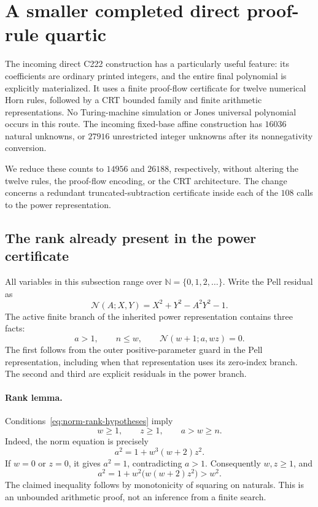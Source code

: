 \section{A smaller completed direct proof-rule quartic}
\label{sec:direct-normalized-power}

The incoming direct C222 construction has a particularly useful feature:
its coefficients are ordinary printed integers, and the entire final
polynomial is explicitly materialized. It uses a finite proof-flow
certificate for twelve numerical Horn rules, followed by a CRT bounded
family and finite arithmetic representations. No Turing-machine simulation
or Jones universal polynomial occurs in this route. The incoming
fixed-base affine construction has $16036$ natural unknowns, or $27916$
unrestricted integer unknowns after its nonnegativity conversion.

We reduce these counts to $14956$ and $26188$, respectively, without
altering the twelve rules, the proof-flow encoding, or the CRT architecture.
The change concerns a redundant truncated-subtraction certificate inside
each of the $108$ calls to the power representation.

\subsection{The rank already present in the power certificate}

All variables in this subsection range over $\mathbb N=\{0,1,2,\ldots\}$.
Write the Pell residual as
\[
 \mathcal N(A;X,Y)=X^2+Y^2-A^2Y^2-1.
\]
The active finite branch of the inherited power representation contains
three facts:
\begin{equation}\label{eq:norm-rank-hypotheses}
 a>1,\qquad n\leq w,\qquad
 \mathcal N(w+1;a,wz)=0.
\end{equation}
The first follows from the outer positive-parameter guard in the Pell
representation, including when that representation uses its zero-index
branch. The second and third are explicit residuals in the power branch.

\paragraph{Rank lemma.}
Conditions~\eqref{eq:norm-rank-hypotheses} imply
\[
 w\geq1,\qquad z\geq1,\qquad a>w\geq n.
\]
Indeed, the norm equation is precisely
\[
 a^2=1+w^3(w+2)z^2.
\]
If $w=0$ or $z=0$, it gives $a^2=1$, contradicting $a>1$.
Consequently $w,z\geq1$, and
\[
 a^2=1+w^2\bigl(w(w+2)z^2\bigr)>w^2.
\]
The claimed inequality follows by monotonicity of squaring on naturals.
This is an unbounded arithmetic proof, not an inference from a finite search.

